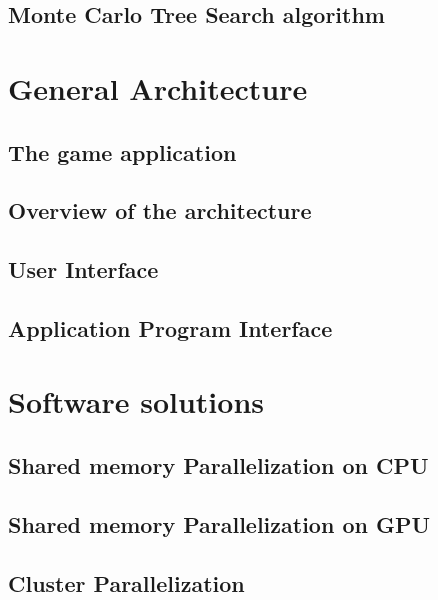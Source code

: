 \documentclass[12pt]{article}
\begin{document}
	\subsection{Monte Carlo Tree Search algorithm}		\label{sec:mcts}			
\newpage

\section{General Architecture}					\label{sec:generalArchitecture} 		
	\subsection{The game application}			\label{sec:gameBehavioiur}		
	\subsection{Overview of the architecture}		\label{sec:globalview}			
	\subsection{User Interface}				\label{sec:ui}				
	\subsection{Application Program Interface}		\label{sec:api}				
\newpage

\section{Software solutions}					\label{sec:softwareSolutions}
	\subsection{Shared memory Parallelization on CPU}	\label{sec:openmp}			
	\subsection{Shared memory Parallelization on GPU}	\label{sec:openacc}			
	\subsection{Cluster Parallelization}			\label{sec:mpi}				
\end{document}
